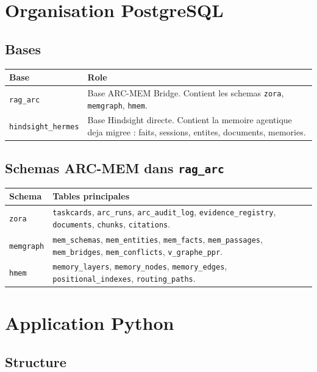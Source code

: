 \documentclass[11pt,a4paper]{article}
\begin{document}
\section{Organisation PostgreSQL}

\subsection{Bases}

\begin{longtable}{|p{4cm}|p{10cm}|}
\hline
\textbf{Base} & \textbf{Role} \\
\hline
\texttt{rag\_arc} & Base ARC-MEM Bridge. Contient les schemas
\texttt{zora}, \texttt{memgraph}, \texttt{hmem}. \\
\hline
\texttt{hindsight\_hermes} & Base Hindsight directe. Contient la memoire
agentique deja migree : faits, sessions, entites, documents, memories. \\
\hline
\end{longtable}

\subsection{Schemas ARC-MEM dans \texttt{rag\_arc}}

\begin{longtable}{|p{3cm}|p{11cm}|}
\hline
\textbf{Schema} & \textbf{Tables principales} \\
\hline
\texttt{zora} & \texttt{taskcards}, \texttt{arc\_runs},
\texttt{arc\_audit\_log}, \texttt{evidence\_registry},
\texttt{documents}, \texttt{chunks}, \texttt{citations}. \\
\hline
\texttt{memgraph} & \texttt{mem\_schemas}, \texttt{mem\_entities},
\texttt{mem\_facts}, \texttt{mem\_passages}, \texttt{mem\_bridges},
\texttt{mem\_conflicts}, \texttt{v\_graphe\_ppr}. \\
\hline
\texttt{hmem} & \texttt{memory\_layers}, \texttt{memory\_nodes},
\texttt{memory\_edges}, \texttt{positional\_indexes},
\texttt{routing\_paths}. \\
\hline
\end{longtable}

\section{Application Python}

\subsection{Structure}
\end{document}
